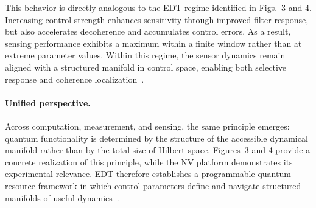 \documentclass[twocolumn,10pt]{article}
\begin{document}
This behavior is directly analogous to the EDT regime identified in Figs.~3 and 4. Increasing control strength enhances sensitivity through improved filter response, but also accelerates decoherence and accumulates control errors. As a result, sensing performance exhibits a maximum within a finite window rather than at extreme parameter values. Within this regime, the sensor dynamics remain aligned with a structured manifold in control space, enabling both selective response and coherence localization~\cite{Degen2017,Barry2020}.

\paragraph*{Unified perspective.}
Across computation, measurement, and sensing, the same principle emerges: quantum functionality is determined by the structure of the accessible dynamical manifold rather than by the total size of Hilbert space. Figures~3 and 4 provide a concrete realization of this principle, while the NV platform demonstrates its experimental relevance. EDT therefore establishes a programmable quantum resource framework in which control parameters define and navigate structured manifolds of useful dynamics~\cite{Preskill2018,Verstraete2008}.

%


\end{document}
